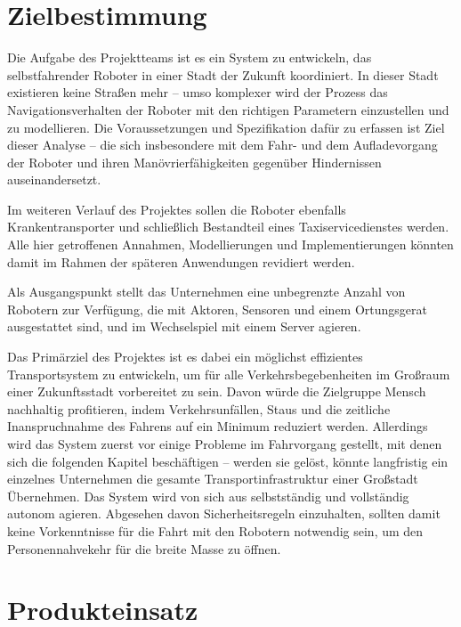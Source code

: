 \documentclass[includeheaders]{scrartcl}
\begin{document}
	\vspace{2cm}
	
	\tableofcontents
	
	\newpage
	
	\section{Zielbestimmung}
	Die Aufgabe des Projektteams ist es ein System zu entwickeln, das selbstfahrender Roboter in einer Stadt der Zukunft koordiniert. In dieser Stadt existieren keine Straßen mehr – umso komplexer wird der Prozess das Navigationsverhalten der Roboter mit den richtigen Parametern einzustellen und zu modellieren. Die Voraussetzungen und Spezifikation dafür zu erfassen ist Ziel dieser Analyse – die sich insbesondere mit dem Fahr- und dem Aufladevorgang der Roboter und ihren Manövrierfähigkeiten gegenüber Hindernissen auseinandersetzt.

	Im weiteren Verlauf des Projektes sollen die Roboter ebenfalls Krankentransporter und schließlich Bestandteil eines Taxiservicedienstes werden. Alle hier getroffenen Annahmen, Modellierungen und Implementierungen könnten damit im Rahmen der späteren Anwendungen revidiert werden.

	Als Ausgangspunkt stellt das Unternehmen eine unbegrenzte Anzahl von Robotern zur Verfügung, die mit Aktoren, Sensoren und einem Ortungsgerat ausgestattet sind, und im Wechselspiel mit einem Server agieren.

	Das Primärziel des Projektes ist es dabei ein möglichst effizientes Transportsystem zu entwickeln, um für alle Verkehrsbegebenheiten im Großraum einer Zukunftsstadt vorbereitet zu sein. Davon würde die Zielgruppe Mensch nachhaltig profitieren, indem Verkehrsunfällen, Staus und die zeitliche Inanspruchnahme des Fahrens auf ein Minimum reduziert werden. Allerdings wird das System zuerst vor einige Probleme im Fahrvorgang gestellt, mit denen sich die folgenden Kapitel beschäftigen – werden sie gelöst, könnte langfristig ein einzelnes Unternehmen die gesamte Transportinfrastruktur einer Großstadt Übernehmen. Das System wird von sich aus selbstständig und vollständig autonom agieren. Abgesehen davon Sicherheitsregeln einzuhalten, sollten damit keine Vorkenntnisse für die Fahrt mit den Robotern notwendig sein, um den Personennahvekehr für die breite Masse zu öffnen. 
	
	\pagebreak
	
	\section{Produkteinsatz}
	
\end{document}
